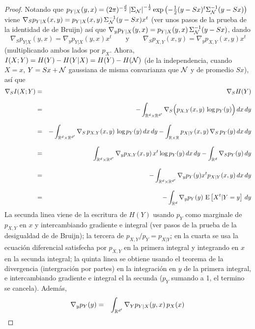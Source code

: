 %
\begin{proof}
  Notando  que  $p_{Y|X} (y,x)  =  (2  \pi)^{-\frac{d}{2}} \left|  \Sigma_{\mathcal{N}}
  \right|^{-\frac12}  \exp\left( -\frac12  (y-S  x)^t \Sigma_{\mathcal{N}}^{-1}  (y-Sx)
  \right)$ viene $\nabla_S p_{Y|X}(x,y)  = p_{Y|X}(x,y) \, \Sigma_{\mathcal{N}}^{-1} (y
  - S x) x^t$  (ver unos pasos de la prueba de la  identidad de de Bruijn) as\'i
  que $\nabla_y  p_{Y|X}(y,x) = p_{Y|X}(y,x)  \, \Sigma_{\mathcal{N}}^{-1} (y -  S x)$,
  dando
  \[
  \nabla_S  p_{Y|X}(y,x)  = \nabla_y  p_{Y|X}(y,x)  x^t  \qquad \mbox{y}  \qquad
  \nabla_S p_{X,Y}(x,y) = \nabla_y p_{X,Y}(x,y) x^t
  \]
  (multiplicando ambos lados por $p_X$. Ahora,  $I(X;Y) = H(Y) - H(Y|X) = H(Y) -
  H(\mathcal{N})$ (de la independencia, cuando $X =  x$, $Y = S x + \mathcal{N}$ gaussiana
  de misma convarianza que $\mathcal{N}$ y de promedio $S x$), as\'i que
  \begin{eqnarray*}
  \nabla_S I(X;Y) & = & \nabla_S H(Y)\\[2.5mm]
  & = & - \int_{\mathbb{R}^d \times \mathbb{R}^{d'}} \nabla_S \Big( p_{X,Y}(x,y) \, \log
  p_Y(y) \Big) \, dx \, dy\\[2.5mm]
  & = & - \int_{\mathbb{R}^d \times \mathbb{R}^{d'}} \nabla_S \, p_{X,Y}(x,y) \, \log p_Y(y) \,
  dx \, dy - \int_{\mathbb{R} \times \mathbb{R}} p_{X|Y}(x,y) \, \nabla_S \, p_Y(y) \, dx \,
  dy\\[2.5mm]
  & = & \int_{\mathbb{R}^d \times \mathbb{R}^{d'}} \nabla_y p_{X,Y}(x,y) \, x^t \log p_Y(y)
  \, dx \, dy - \int_{\mathbb{R}^d} \nabla_S p_Y(y) \, dy\\[2.5mm]
  & = & - \int_{\mathbb{R}^d \times \mathbb{R}^{d'}} \nabla_y p_Y(y) x^t p_{X|Y}(x,y) \, dx
  \, dy\\[2.5mm]
  & = & - \int_{\mathbb{R}^d} \nabla_y p_Y(y) \, \operatorname{E}\left[X^t | Y = y \right] \, dy
  \end{eqnarray*}
  La secunda linea  viene de la escritura de $H(Y)$  usando $p_Y$ como marginale
  de $p_{X,Y}$  en $x$ y  intercambiando gradiente e  integral (ver pasos  de la
  prueba de la desigualdad de de Bruijn); la tercera de $p_{X,Y}/p_Y = p_{X|Y}$;
  en la cuarta  se usa la ecuaci\'on diferencial satisfecha  por $p_{X,Y}$ en la
  primera integral y  integrando en $x$ en la secunda  integral; la quinta linea
  se obtiene usando el teorema  de la divergencia (intergraci\'on por partes) en
  la integraci\'on en  $y$ de la primera integral,  e intercambiando gradiente e
  integral el la secunda ($p_Y$ sumando a 1, el termino se cancela). Adem\'as,
  \begin{eqnarray*}
  \nabla_y p_Y(y) & = & \int_{\Rset^{d'}} \nabla_Y p_{Y|X}(y,x) \, p_X(x) \,

\end{eqnarray*}
\end{proof}
